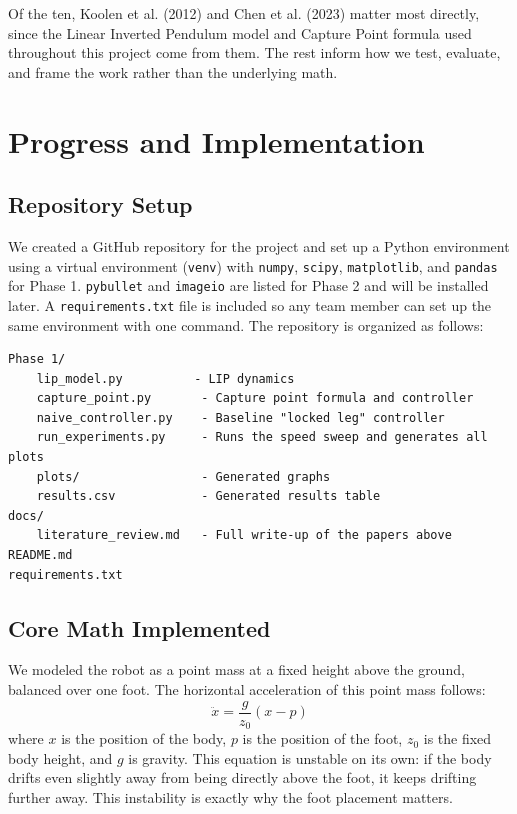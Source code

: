 \documentclass{llncs}
\begin{document}
Of the ten, Koolen et al. (2012) and Chen et al. (2023) matter most directly, since the Linear
Inverted Pendulum model and Capture Point formula used throughout this project come from them.
The rest inform how we test, evaluate, and frame the work rather than the underlying math.

\section{Progress and Implementation}
\label{sec:progress}

\subsection{Repository Setup}
\label{sec:repo}

We created a GitHub repository for the project and set up a Python environment using a virtual
environment (\texttt{venv}) with \texttt{numpy}, \texttt{scipy}, \texttt{matplotlib}, and
\texttt{pandas} for Phase 1. \texttt{pybullet} and \texttt{imageio} are listed for Phase 2 and
will be installed later. A \texttt{requirements.txt} file is included so any team member can set
up the same environment with one command. The repository is organized as follows:

\begin{verbatim}
Phase 1/
    lip_model.py          - LIP dynamics
    capture_point.py       - Capture point formula and controller
    naive_controller.py    - Baseline "locked leg" controller
    run_experiments.py     - Runs the speed sweep and generates all plots
    plots/                 - Generated graphs
    results.csv            - Generated results table
docs/
    literature_review.md   - Full write-up of the papers above
README.md
requirements.txt
\end{verbatim}

\subsection{Core Math Implemented}
\label{sec:math}

We modeled the robot as a point mass at a fixed height above the ground, balanced over one foot.
The horizontal acceleration of this point mass follows:
\begin{equation}
\ddot{x} = \frac{g}{z_0}(x - p)
\label{eq:lip}
\end{equation}
where $x$ is the position of the body, $p$ is the position of the foot, $z_0$ is the fixed body
height, and $g$ is gravity. This equation is unstable on its own: if the body drifts even
slightly away from being directly above the foot, it keeps drifting further away. This instability
is exactly why the foot placement matters.
\end{document}
